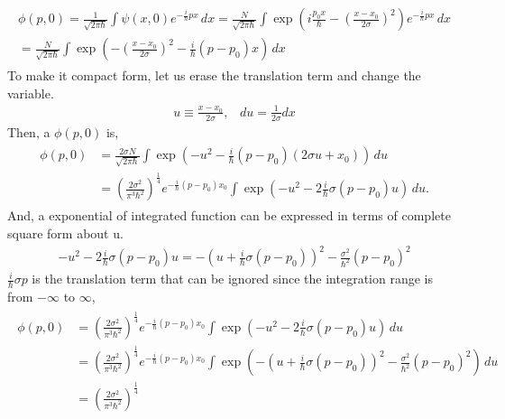 \documentclass[floatfix,nofootinbib,superscriptaddress,fleqn]{revtex4-2}
\begin{document}
\begin{itemize}
\begin{align*}
    \begin{split} 
      \phi(p,0)=\frac{1}{\sqrt{2\pi\hbar}}
      \int\psi(x,0) e^{-\frac{i}{\hbar}px}\,dx
      =\frac{N}{\sqrt{2\pi\hbar}}
      \int\exp\left(i\frac{p_0 x}{\hbar}-{\left(
        \frac{x-x_0}{2\sigma}\right)}^2\right) 
        e^{-\frac{i}{\hbar}px}\,dx  \\
        =\frac{N}{\sqrt{2\pi\hbar}}
        \int\exp\left(-{\left(\frac{x-x_0}{2\sigma}\right)}^2
        -\frac{i}{\hbar}(p-p_0)x\right)\,dx
      \end{split}
  \end{align*}
  To make it compact form, let us erase the translation term 
  and change the variable.
  \begin{align*}
    u \equiv \frac{x-x_0}{2\sigma},\;\;\; du = \frac{1}{2\sigma} dx 
  \end{align*}
  Then, a $\phi(p,0)$ is,
  \begin{align*}
    \begin{split}
      \phi(p,0)&=\frac{2\sigma N}{\sqrt{2\pi\hbar}}
      \int\exp\left(-{u}^2-\frac{i}{\hbar}(p-p_0)(2\sigma u+x_0)\right)\,du \\
      &={\left(\frac{2\sigma^2}{\pi^3\hbar^2}\right)}^{\frac{1}{4}}
      e^{-\frac{i}{\hbar}(p-p_0)x_0}
      \int\exp\left(-u^2-2\frac{i}{\hbar}\sigma (p-p_0)u\right)\,du.
    \end{split}
  \end{align*}
  And, a exponential of integrated function can be expressed 
  in terms of complete square form about u.
  \begin{align}
    -u^2-2\frac{i}{\hbar}\sigma (p-p_0)u 
    = -{\left( u+\frac{i}{\hbar}\sigma (p-p_0)\right)}^2
    -\frac{\sigma^2}{\hbar^2}{(p-p_0)}^2
  \end{align}
  $\frac{i}{\hbar}\sigma p$ is the translation term that can be ignored 
  since the integration range is from $-\infty$ to $\infty$,
  \begin{align*}
    \begin{split}  
      \phi(p,0) &= {\left(\frac{2\sigma^2}{\pi^3\hbar^2}\right)}^{\frac{1}{4}}
      e^{-\frac{i}{\hbar}(p-p_0)x_0}
      \int\exp\left(-u^2-2\frac{i}{\hbar}\sigma (p-p_0)u\right)\,du \\
      &={\left(\frac{2\sigma^2}{\pi^3\hbar^2}\right)}^{\frac{1}{4}}
      e^{-\frac{i}{\hbar}(p-p_0)x_0}  
      \int\exp\left(-{\left( u+\frac{i}{\hbar}\sigma (p-p_0)\right)}^2
      -\frac{\sigma^2}{\hbar^2}(p-p_0)^2\right)\,du \\
      &= {\left(\frac{2\sigma^2}{\pi^3\hbar^2}\right)}^{\frac{1}{4}}

\end{split}
\end{align*}
\end{itemize}
\end{document}
